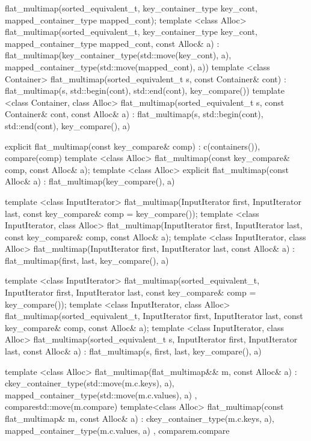 \begin{codeblock}
\begin{codeblock}
\begin{codeblock}
\begin{addedblock}
\begin{codeblock}
{{    flat_multimap(sorted_equivalent_t,
                  key_container_type key_cont, mapped_container_type mapped_cont);
    template <class Alloc>
    flat_multimap(sorted_equivalent_t, key_container_type key_cont,
                  mapped_container_type mapped_cont, const Alloc& a)
        : flat_multimap(key_container_type(std::move(key_cont), a),
                        mapped_container_type(std::move(mapped_cont), a))
      { }
    template <class Container>
      flat_multimap(sorted_equivalent_t s, const Container& cont)
        : flat_multimap(s, std::begin(cont), std::end(cont), key_compare()) { }
    template <class Container, class Alloc>
      flat_multimap(sorted_equivalent_t s, const Container& cont, const Alloc& a)
        : flat_multimap(s, std::begin(cont), std::end(cont), key_compare(), a) { }

    explicit flat_multimap(const key_compare& comp)
      : c(containers()), compare(comp) { }
    template <class Alloc>
      flat_multimap(const key_compare& comp, const Alloc& a);
    template <class Alloc>
      explicit flat_multimap(const Alloc& a)
        : flat_multimap(key_compare(), a) { }

    template <class InputIterator>
      flat_multimap(InputIterator first, InputIterator last,
                    const key_compare& comp = key_compare());
    template <class InputIterator, class Alloc>
      flat_multimap(InputIterator first, InputIterator last,
                    const key_compare& comp, const Alloc& a);
    template <class InputIterator, class Alloc>
      flat_multimap(InputIterator first, InputIterator last,
                    const Alloc& a)
        : flat_multimap(first, last, key_compare(), a) { }

    template <class InputIterator>
      flat_multimap(sorted_equivalent_t, InputIterator first, InputIterator last,
                    const key_compare& comp = key_compare());
    template <class InputIterator, class Alloc>
      flat_multimap(sorted_equivalent_t, InputIterator first, InputIterator last,
                    const key_compare& comp, const Alloc& a);
    template <class InputIterator, class Alloc>
      flat_multimap(sorted_equivalent_t s, InputIterator first, InputIterator last,
                    const Alloc& a)
        : flat_multimap(s, first, last, key_compare(), a) { }

    template <class Alloc>
      flat_multimap(flat_multimap&& m, const Alloc& a)
        : c{key_container_type(std::move(m.c.keys), a),
            mapped_container_type(std::move(m.c.values), a)}
        , compare{std::move(m.compare)}
      { }
    template<class Alloc>
      flat_multimap(const flat_multimap& m, const Alloc& a)
        : c{key_container_type(m.c.keys, a), mapped_container_type(m.c.values, a)}
        , compare{m.compare}
      { }

}}
\end{codeblock}
\end{addedblock}
\end{codeblock}
\end{codeblock}
\end{codeblock}
